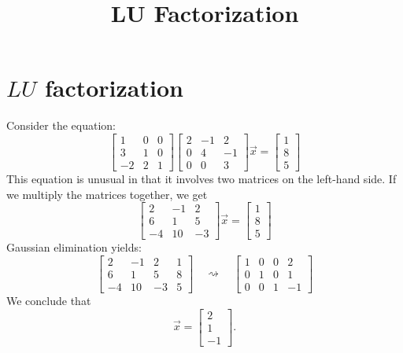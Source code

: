 \documentclass{ximera}
\title{LU Factorization} \license{CC BY-NC-SA 4.0}
\begin{document}
\begin{abstract}

\end{abstract}
\maketitle
\section*{$LU$ factorization}

\begin{exploration}\label{init:LUfactorization}
Consider the equation:
$$\begin{bmatrix}1&0&0\\3&1&0\\-2&2&1\end{bmatrix}\begin{bmatrix}2&-1&2\\0&4&-1\\0&0&3\end{bmatrix}\vec{x}=\begin{bmatrix}1\\8\\5\end{bmatrix}$$
This equation is unusual in that it involves two matrices on the left-hand side.  If we multiply the matrices together, we get
$$\begin{bmatrix}2&-1&2\\6&1&5\\-4&10&-3\end{bmatrix}\vec{x}=\begin{bmatrix}1\\8\\5\end{bmatrix}$$
Gaussian elimination yields:
$$\left[\begin{array}{ccc|c}
2&-1&2&1\\6&1&5&8\\-4&10&-3&5
\end{array}\right]
\quad\rightsquigarrow\quad
\left[\begin{array}{ccc|c}
 1&0&0&2\\0&1&0&1\\0&0&1&-1
\end{array}\right]
$$
We conclude that
$$\vec{x}=\begin{bmatrix}2\\1\\-1\end{bmatrix}.$$


\end{exploration}
\end{document}
